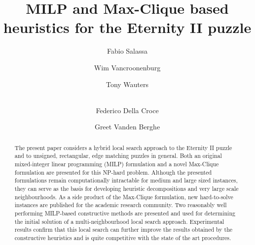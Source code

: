 \documentclass[preprint,12pt]{elsarticle}
\begin{document}
\begin{frontmatter}



\title{MILP and Max-Clique based heuristics for the Eternity II puzzle} %


\author[1]{Fabio Salassa}
\author[2]{Wim Vancroonenburg}
\author[2]{Tony Wauters}
\author[1]{\\Federico Della Croce}
\author[2]{Greet Vanden Berghe}


\address[1]{Politecnico di Torino, DIGEP, Corso Duca degli Abruzzi 24, 10129 Torino, Italy}
\address[2]{KU Leuven, Department of Computer Science, CODeS \& iMinds-ITEC,\\ Gebroeders De Smetstraat 1, 9000 Gent, Belgium}


\begin{abstract}
The present paper considers a hybrid local search approach to the Eternity II puzzle 
and to unsigned, rectangular, edge matching puzzles in general.
Both an original mixed-integer linear programming (MILP) formulation and a novel Max-Clique formulation are presented for this NP-hard problem.
Although the presented formulations remain computationally intractable for medium and large sized instances, they can serve as the basis for developing heuristic decompositions and very large scale neighbourhoods. As a side product of the Max-Clique formulation, new hard-to-solve instances are published for the academic research community.
Two reasonably well performing MILP-based constructive methods are presented and used for determining the initial solution of a multi-neighbourhood local search approach.
Experimental results confirm that this local search can further improve the results obtained by the constructive heuristics and is quite competitive with the state of the art procedures.


\end{abstract}
\end{frontmatter}
\end{document}
